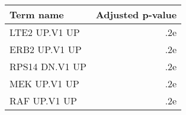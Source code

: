 \begin{tabular}{lr}
\toprule
     Term name &  Adjusted p-value \\
\midrule
 LTE2 UP.V1 UP &               .2e \\
 ERB2 UP.V1 UP &               .2e \\
RPS14 DN.V1 UP &               .2e \\
  MEK UP.V1 UP &               .2e \\
  RAF UP.V1 UP &               .2e \\
\bottomrule
\end{tabular}
